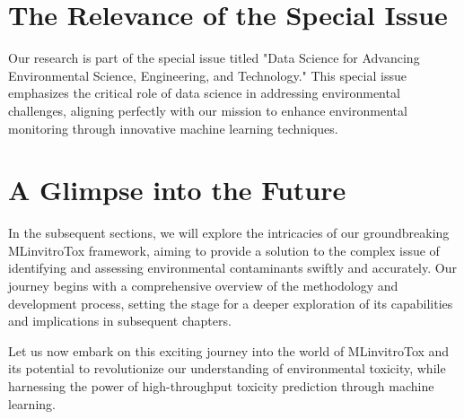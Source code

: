 \section{The Relevance of the Special Issue}

Our research is part of the special issue titled "Data Science for Advancing Environmental Science, Engineering, and Technology." This special issue emphasizes the critical role of data science in addressing environmental challenges, aligning perfectly with our mission to enhance environmental monitoring through innovative machine learning techniques.

\section{A Glimpse into the Future}

In the subsequent sections, we will explore the intricacies of our groundbreaking MLinvitroTox framework, aiming to provide a solution to the complex issue of identifying and assessing environmental contaminants swiftly and accurately. Our journey begins with a comprehensive overview of the methodology and development process, setting the stage for a deeper exploration of its capabilities and implications in subsequent chapters.

Let us now embark on this exciting journey into the world of MLinvitroTox and its potential to revolutionize our understanding of environmental toxicity, while harnessing the power of high-throughput toxicity prediction through machine learning.

